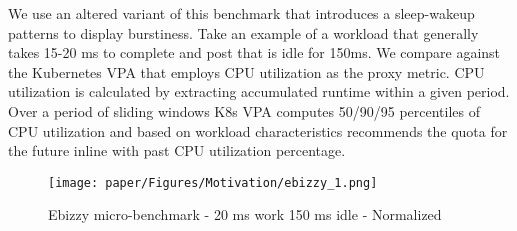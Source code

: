 
We use an altered variant of this benchmark \cite{bhat_pratiksampatsleeping-ebizzy_2014} that introduces a sleep-wakeup patterns to display burstiness. Take an example of a workload that generally takes 15-20 ms to complete and post that is idle for 150ms. We compare against the Kubernetes VPA that employs CPU utilization as the proxy metric. CPU utilization is calculated by extracting accumulated runtime within a given period. Over a period of sliding windows K8s VPA computes 50/90/95 percentiles of CPU utilization and based on workload characteristics recommends the quota for the future inline with past CPU utilization percentage.


\begin{figure}[h]
    \centering
    \texttt{[image: paper/Figures/Motivation/ebizzy\_1.png]}
    \caption{Ebizzy micro-benchmark - 20 ms work 150 ms idle - Normalized } \label{fig:mot_ebizzy1}
    \end{figure}


